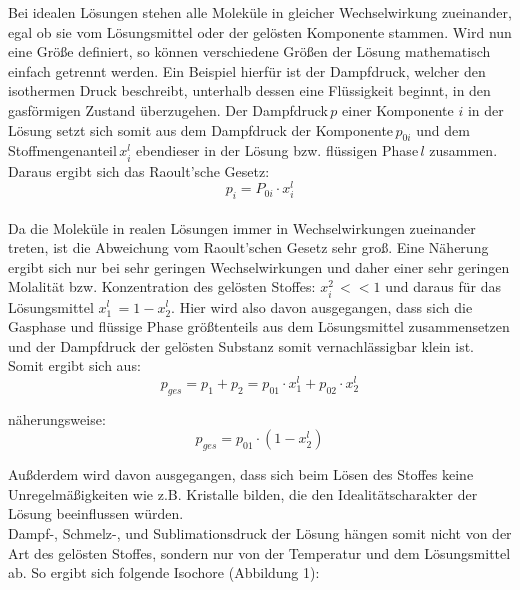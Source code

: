 \documentclass[12pt,a4paper,titlepage,headinclude,bibtotoc]{scrartcl}
\begin{document}
Bei idealen Lösungen stehen alle Moleküle in gleicher Wechselwirkung zueinander, egal ob sie vom Lösungsmittel oder der gelösten Komponente stammen. 
Wird nun eine Größe definiert, so können verschiedene Größen der Lösung mathematisch einfach getrennt werden. Ein Beispiel hierfür ist der Dampfdruck, welcher den isothermen Druck beschreibt, unterhalb dessen eine Flüssigkeit beginnt, in den gasförmigen Zustand überzugehen.
Der Dampfdruck\,$p$ einer Komponente $i$ in der Lösung setzt sich somit aus dem Dampfdruck der Komponente\,$p_{0i}$ und dem Stoffmengenanteil\,$x_i^l$ ebendieser in der Lösung bzw. flüssigen Phase\,$l$ zusammen.
Daraus ergibt sich das Raoult'sche Gesetz:\\

\begin{equation}
p_i = P_{0i} \cdot x_i^{l}
\end{equation}
\\

Da die Moleküle in realen Lösungen immer in Wechselwirkungen zueinander treten, ist die Abweichung vom Raoult'schen Gesetz sehr groß. Eine Näherung ergibt sich nur bei sehr geringen Wechselwirkungen und daher einer sehr geringen Molalität bzw. Konzentration des gelösten Stoffes: $x_i^2\,<<1$ und daraus für das Lösungsmittel $x_1^l\,= 1 - x_2^l$. Hier wird also davon ausgegangen, dass sich die Gasphase und flüssige Phase größtenteils aus dem Lösungsmittel zusammensetzen und der Dampfdruck der gelösten Substanz somit vernachlässigbar klein ist. Somit ergibt sich aus: \\

\begin{equation}
p_{ges} = p_1 + p_2 = p_{01} \cdot x_1^l + p_{02} \cdot x_2^l
\end{equation}

näherungsweise:
\begin{equation}
p_{ges} = p_{01} \cdot (1-x_2^l)
\end{equation}

Außderdem wird davon ausgegangen, dass sich beim Lösen des Stoffes keine Unregelmäßigkeiten wie z.B. Kristalle bilden, die den Idealitätscharakter der Lösung beeinflussen würden.\\

Dampf-, Schmelz-, und Sublimationsdruck der Lösung hängen somit nicht von der Art des gelösten Stoffes, sondern nur von der Temperatur und dem Lösungsmittel ab. So ergibt sich folgende Isochore (Abbildung 1):\\
\end{document}
